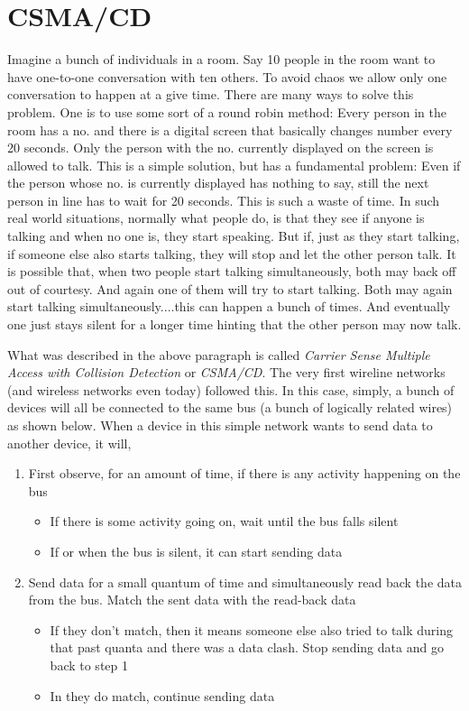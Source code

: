 \section{CSMA/CD}
Imagine a bunch of individuals in a room. Say 10 people in the room want to have one-to-one conversation with ten others. To avoid chaos we allow only one conversation to happen at a give time. There are many ways to solve this problem. One is to use some sort of a round robin method: Every person in the room has a no. and there is a digital screen that basically changes number every 20 seconds. Only the person with the no. currently displayed on the screen is allowed to talk. This is a simple solution, but has a fundamental problem: Even if the person whose no. is currently displayed has nothing to say, still the next person in line has to wait for 20 seconds. This is such a waste of time. In such real world situations, normally what people do, is that they see if anyone is talking and when no one is, they start speaking. But if, just as they start talking, if someone else also starts talking, they will stop and let the other person talk. It is possible that, when two people start talking simultaneously, both may back off out of courtesy. And again one of them will try to start talking. Both may again start talking simultaneously....this can happen a bunch of times. And eventually one just stays silent for a longer time hinting that the other person may now talk.

What was described in the above paragraph is called \emph{Carrier Sense Multiple Access with Collision Detection} or \emph{CSMA/CD}. The very first wireline networks (and wireless networks even today) followed this. In this case, simply, a bunch of devices will all be connected to the same bus (a bunch of logically related wires) as shown below. When a device in this simple network wants to send data to another device, it will,
	\begin{enumerate}
	\item First observe, for an amount of time, if there is any activity happening on the bus
		\begin {itemize}
		\item If there is some activity going on, wait until the bus falls silent
		\item If or when the bus is silent, it can start sending data
		\end{itemize}
	\item Send data for a small quantum of time and simultaneously read back the data from the bus. Match the sent data with the read-back data
		\begin{itemize}
		\item If they don't match, then it means someone else also tried to talk during that past quanta and there was a data clash. Stop sending data and go back to step 1
		\item In they do match, continue sending data
		\end{itemize}
	\end{enumerate}
	
